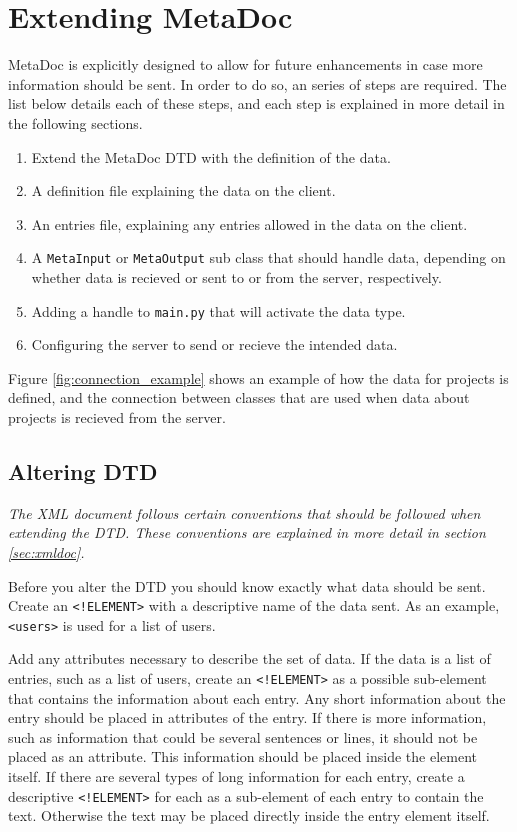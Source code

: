 \newpage
\section{Extending MetaDoc}
\label{sec:extending}
MetaDoc is explicitly designed to allow for future enhancements in case more
information should be sent. In order to do so, an series of steps are required.
The list below details each of these steps, and each step is explained in more
detail in the following sections.

\begin{enumerate}
    \item
        Extend the MetaDoc DTD with the definition of the data.
    \item
        A definition file explaining the data on the client.
    \item
        An entries file, explaining any entries allowed in the data on the 
        client.
    \item
        A \texttt{MetaInput} or \texttt{MetaOutput} sub class that should
        handle data, depending on whether data is recieved or sent to or from
        the server, respectively.
    \item
        Adding a handle to \texttt{main.py} that will activate the data type.
    \item
        Configuring the server to send or recieve the intended data.
\end{enumerate}

Figure \ref{fig:connection_example} shows an example of how the data for
projects is defined, and the connection between classes that are used when data
about projects is recieved from the server.


\subsection{Altering DTD}
\textit{The XML document follows certain conventions that should be followed when
extending the DTD. These conventions are explained in more detail in section
\ref{sec:xmldoc}.}

Before you alter the DTD you should know exactly what data should be sent.
Create an \texttt{<!ELEMENT>} with a descriptive name of the data sent. As an
example, \texttt{<users>} is used for a list of users. 

Add any attributes necessary to describe the set of data. If the data is a list
of entries, such as a list of users, create an \texttt{<!ELEMENT>} as a
possible sub-element that contains the information about each entry. Any short
information about the entry should be placed in attributes of the entry. If
there is more information, such as information that could be several sentences
or lines, it should not be placed as an attribute. This information should be
placed inside the element itself. If there are several types of long
information for each entry, create a descriptive \texttt{<!ELEMENT>} for each
as a sub-element of each entry to contain the text. Otherwise the text may be
placed directly inside the entry element itself. 

